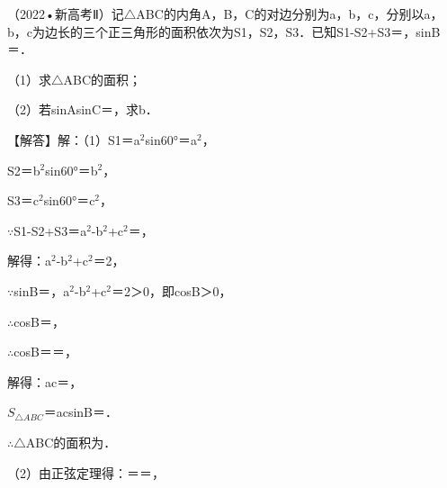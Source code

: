 \begin{question}
（2022•新高考Ⅱ）记$\triangle$ABC的内角A，B，C的对边分别为a，b，c，分别以a，b，c为边长的三个正三角形的面积依次为S1，S2，S3．已知S1-S2+S3＝\allowbreak{}，sinB＝\allowbreak{}．\par
（1）求$\triangle$ABC的面积；\par
（2）若sinAsinC＝\allowbreak{}，求b．\par
\begin{solution}
【解答】解：（1）S1＝\allowbreak{}a$^{2}$sin60°＝\allowbreak{}a$^{2}$，\par
S2＝\allowbreak{}b$^{2}$sin60°＝\allowbreak{}b$^{2}$，\par
S3＝\allowbreak{}c$^{2}$sin60°＝\allowbreak{}c$^{2}$，\par
$\because$S1-S2+S3＝\allowbreak{}a$^{2}$-\allowbreak{}b$^{2}$+\allowbreak{}c$^{2}$＝\allowbreak{}，\par
解得：a$^{2}$-b$^{2}$+c$^{2}$＝2，\par
$\because$sinB＝\allowbreak{}，a$^{2}$-b$^{2}$+c$^{2}$＝2＞0，即cosB＞0，\par
$\therefore$cosB＝\allowbreak{}，\par
$\therefore$cosB＝\allowbreak{}＝\allowbreak{}，\par
解得：ac＝\allowbreak{}，\par
$S_{\triangle ABC}$＝\allowbreak{}acsinB＝\allowbreak{}．\par
$\therefore$$\triangle$ABC的面积为\allowbreak{}．\par
（2）由正弦定理得：\allowbreak{}＝\allowbreak{}＝\allowbreak{}，\par
$$
\end{solution}
\end{question}
